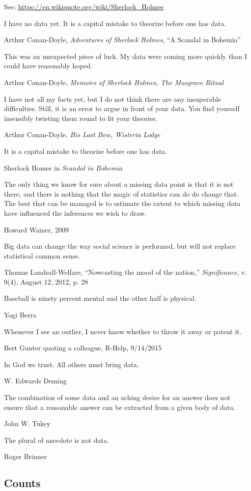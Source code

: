 See: \url{https://en.wikiquote.org/wiki/Sherlock_Holmes}

\epigraph{I have no data yet. It is a capital mistake to theorize before one has data.}{Arthur Conan-Doyle, \emph{Adventures of Sherlock Holmes}, ``A Scandal in Bohemia''}

\epigraph{This was an unexpected piece of luck. My data were coming more quickly than I could have reasonably hoped.}{Arthur Conan-Doyle, \emph{Memoirs of Sherlock Holmes, The Musgrave Ritual}}


\epigraph{I have not all my facts yet, but I do not think there are any insuperable difficulties. Still, it is an error to argue in front of your data. You find yourself insensibly twisting them round to fit your theories.}{Arthur Conan-Doyle, \emph{His Last Bow, Wisteria Lodge}}

\epigraph{It is a capital mistake to theorize before one has data.}{Sherlock Homes in \emph{Scandal in Bohemia}}


\epigraph{The only thing we know for sure about a missing data point is that it is not there, and there is nothing that the magic of statistics can do do change that.  The best that can be managed is to estimate the extent to which missing data have influenced the inferences we wish to draw.}{Howard Wainer, 2009}

\epigraph{Big data can change the way social science is performed, but will not replace statistical common sense.}{Thomas Landsall-Welfare, ``Nowcasting the mood of the nation,'' \emph{Significance}, v. 9(4), August 12, 2012, p. 28}

\epigraph{Baseball is ninety percent mental and the other half is physical.}{Yogi Berra}

\epigraph{Whenever I see an outlier, I never know whether to throw it away or patent it.}{Bert Gunter quoting a colleague, R-Help, 9/14/2015}

\epigraph{In God we trust. All others must bring data.}{W. Edwards Deming}

\epigraph{The combination of some data and an aching desire for an answer does not ensure that a reasonable answer can be extracted from a given body of data.}{John W. Tukey}

\epigraph{The plural of anecdote is not data.}{Roger Brinner}
\subsection{Counts}

